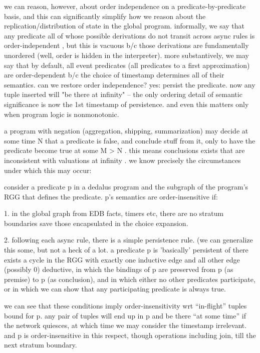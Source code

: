 we can reason, however, about order independence on a predicate-by-predicate basis, and this
can significantly simplify how we reason about the replication/distribution of state in the
global program.  informally, we say that any predicate all of whose possible derivations 
do not transit across async rules is order-independent , but this is vacuous b/c those derivations
are fundamentally unordered (well, order is hidden in the interpreter).  more substantively,
we may say that by default, all event predicates (all predicates to a first approximation) 
are order-dependent b/c the choice of timestamp determines all of their semantics.  
can we restore order independence?  yes: persist the predicate.  now any tuple inserted will
"be there at infinity" -- the only ordering detail of semantic significance is now the 1st 
timestamp of persistence.  and even this matters only when program logic is nonmonotonic. 

a program with negation (aggregation, shipping, summarization) may decide at some time N
that a predicate is false, and conclude stuff from it, only to have the predicate become
true at some M > N .  this means conclusions exists that are inconsistent with valuations at
infinity .  we know precisely the circumstances under which this may occur:

consider a predicate p in a dedalus program and the subgraph of the program's RGG that 
defines the predicate.  p's semantics are order-insensitive if:

1. in the global graph from EDB facts, timers etc, there are no stratum boundaries save those encapsulated in the choice expansion.

2. following each async rule, there is a simple persistence rule.  (we can generalize this some,
but not a heck of a lot.  a predicate p is 'basically' persistent of there exists a cycle in the RGG 
with exactly one inductive edge and all other edge (possibly 0) deductive, in which the 
bindings of p are preserved from p (as premise) to p (as conclusion), and in which either no other predicates participate, or in which we can show that any participating predicate is always true.

we can see that these conditions imply order-insensitivity wrt ``in-flight'' tuples bound for p.
any pair of tuples will end up in p and be there ``at some time'' if the network quiesces, at 
which time we may consider the timestamp irrelevant.  and p is order-insensitive in this respect,
though operations including join, till the next stratum boundary.

